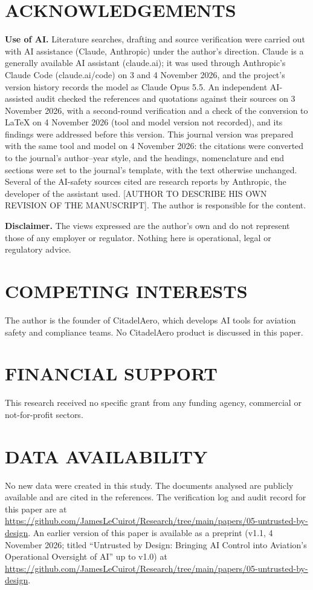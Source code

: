 \documentclass{aer}
\begin{document}
\section*{ACKNOWLEDGEMENTS}
\textbf{Use of AI.} Literature searches, drafting and source verification were carried out with AI assistance (Claude, Anthropic) under the author's direction. Claude is a generally available AI assistant (claude.ai); it was used through Anthropic's Claude Code (claude.ai/code) on 3 and 4 November 2026, and the project's version history records the model as Claude Opus 5.5. An independent AI-assisted audit checked the references and quotations against their sources on 3 November 2026, with a second-round verification and a check of the conversion to LaTeX on 4 November 2026 (tool and model version not recorded), and its findings were addressed before this version. This journal version was prepared with the same tool and model on 4 November 2026: the citations were converted to the journal's author--year style, and the headings, nomenclature and end sections were set to the journal's template, with the text otherwise unchanged. Several of the AI-safety sources cited are research reports by Anthropic, the developer of the assistant used. [AUTHOR TO DESCRIBE HIS OWN REVISION OF THE MANUSCRIPT]. The author is responsible for the content.

\textbf{Disclaimer.} The views expressed are the author's own and do not represent those of any employer or regulator. Nothing here is operational, legal or regulatory advice.

\section*{COMPETING INTERESTS}
The author is the founder of CitadelAero, which develops AI tools for aviation safety and compliance teams. No CitadelAero product is discussed in this paper.

\section*{FINANCIAL SUPPORT}
This research received no specific grant from any funding agency, commercial or not-for-profit sectors.

\section*{DATA AVAILABILITY}
No new data were created in this study. The documents analysed are publicly available and are cited in the references. The verification log and audit record for this paper are at \url{https://github.com/JamesLeCuirot/Research/tree/main/papers/05-untrusted-by-design}. An earlier version of this paper is available as a preprint (v1.1, 4 November 2026; titled ``Untrusted by Design: Bringing AI Control into Aviation's Operational Oversight of AI'' up to v1.0) at \url{https://github.com/JamesLeCuirot/Research/tree/main/papers/05-untrusted-by-design}.



\end{document}
